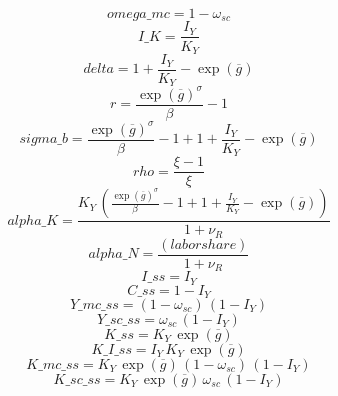 \begin{dmath*}
omega\_mc = 1-{\omega_{sc}}
\end{dmath*}
\begin{dmath*}
I\_K = \frac{{{I_Y}}}{{{K_Y}}}
\end{dmath*}
\begin{dmath*}
delta = 1+\frac{{{I_Y}}}{{{K_Y}}}-\exp\left({{\overline{g}}}\right)
\end{dmath*}
\begin{dmath*}
r = \frac{\exp\left({{\overline{g}}}\right)^{{{\sigma}}}}{{{\beta}}}-1
\end{dmath*}
\begin{dmath*}
sigma\_b = \frac{\exp\left({{\overline{g}}}\right)^{{{\sigma}}}}{{{\beta}}}-1+1+\frac{{{I_Y}}}{{{K_Y}}}-\exp\left({{\overline{g}}}\right)
\end{dmath*}
\begin{dmath*}
rho = \frac{{\xi}-1}{{\xi}}
\end{dmath*}
\begin{dmath*}
alpha\_K = \frac{{{K_Y}}\, \left(\frac{\exp\left({{\overline{g}}}\right)^{{{\sigma}}}}{{{\beta}}}-1+1+\frac{{{I_Y}}}{{{K_Y}}}-\exp\left({{\overline{g}}}\right)\right)}{1+{{\nu_R}}}
\end{dmath*}
\begin{dmath*}
alpha\_N = \frac{{(labor share)}}{1+{{\nu_R}}}
\end{dmath*}
\begin{dmath*}
I\_ss = {{I_Y}}
\end{dmath*}
\begin{dmath*}
C\_ss = 1-{{I_Y}}
\end{dmath*}
\begin{dmath*}
Y\_mc\_ss = \left(1-{\omega_{sc}}\right)\, \left(1-{{I_Y}}\right)
\end{dmath*}
\begin{dmath*}
Y\_sc\_ss = {\omega_{sc}}\, \left(1-{{I_Y}}\right)
\end{dmath*}
\begin{dmath*}
K\_ss = {{K_Y}}\, \exp\left({{\overline{g}}}\right)
\end{dmath*}
\begin{dmath*}
K\_I\_ss = {{I_Y}}\, {{K_Y}}\, \exp\left({{\overline{g}}}\right)
\end{dmath*}
\begin{dmath*}
K\_mc\_ss = {{K_Y}}\, \exp\left({{\overline{g}}}\right)\, \left(1-{\omega_{sc}}\right)\, \left(1-{{I_Y}}\right)
\end{dmath*}
\begin{dmath*}
K\_sc\_ss = {{K_Y}}\, \exp\left({{\overline{g}}}\right)\, {\omega_{sc}}\, \left(1-{{I_Y}}\right)
\end{dmath*}
